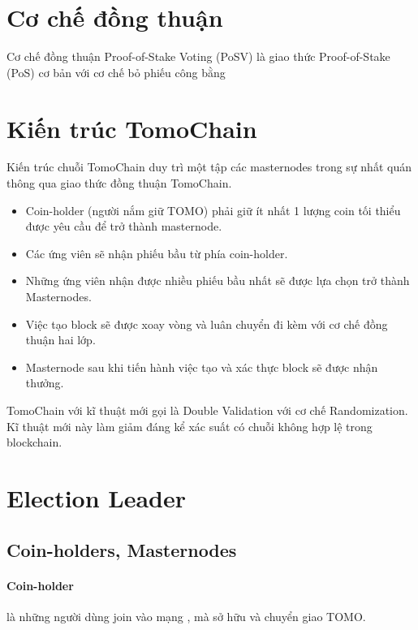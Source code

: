 \documentclass[12pt,a4paper]{article}
\begin{document}
	\section{Cơ chế đồng thuận}
	Cơ chế đồng thuận Proof-of-Stake Voting (PoSV) là giao thức Proof-of-Stake (PoS) cơ bản với cơ chế bỏ phiếu công bằng
	\section{Kiến trúc TomoChain}
	Kiến trúc chuỗi TomoChain duy trì một tập các masternodes trong sự nhất quán thông qua giao thức đồng thuận TomoChain. 
	\begin{itemize}
		\item Coin-holder (người nắm giữ TOMO) phải giữ ít nhất 1 lượng coin tối thiểu được yêu cầu để trở thành masternode.
		\item Các ứng viên sẽ nhận phiếu bầu từ phía coin-holder.
		\item Những ứng viên nhận được nhiều phiếu bầu nhất sẽ được lựa chọn trở thành Masternodes.
		\item Việc tạo block sẽ được xoay vòng và luân chuyển đi kèm với cơ chế đồng thuận hai lớp.
		\item Masternode sau khi tiến hành việc tạo và xác thực block sẽ được nhận thưởng.
	\end{itemize} 
	TomoChain với kĩ thuật mới gọi là Double Validation với cơ chế Randomization.  Kĩ thuật mới này làm giảm đáng kể xác suất có chuỗi không hợp lệ trong blockchain.

	\section{Election Leader}
	\subsection{Coin-holders, Masternodes}
		\paragraph{Coin-holder}
		 là những người dùng join vào mạng , mà sở hữu và chuyển giao TOMO.
\end{document}
